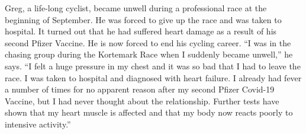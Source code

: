 Greg, a life-long cyclist, became unwell during a professional race at the
beginning of September. He was forced to give up the race and was taken to
hospital. It turned out that he had suffered heart damage as a result of his
second Pfizer Vaccine. He is now forced to end his cycling career.
“I was in the chasing group during the Kortemark Race when I suddenly became
unwell,” he says. “I felt a huge pressure in my chest and it was so bad
that I had to leave the race. I was taken to hospital and diagnosed with heart
failure. I already had fever a number of times for no apparent reason after my
second Pfizer Covid-19 Vaccine, but I had never thought about the relationship.
Further tests have shown that my heart muscle is affected and that my body now
reacts poorly to intensive activity.”

